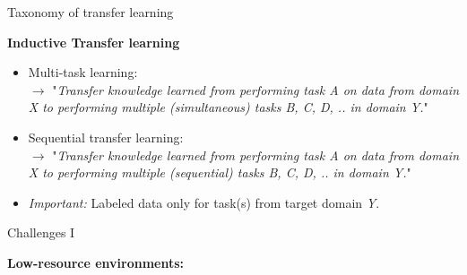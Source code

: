 
\begin{frame}{Taxonomy of transfer learning \href{https://ruder.io/thesis/}{}}

\vfill

	\textbf{Inductive Transfer learning}

	\begin{itemize}
		\item Multi-task learning:\\
					$\rightarrow$ "\textit{Transfer knowledge learned from performing task A on data from domain X to performing multiple (simultaneous) tasks B, C, D, .. in domain Y.}"\\\mbox{}
		\item Sequential transfer learning:\\
					$\rightarrow$ "\textit{Transfer knowledge learned from performing task A on data from domain X to performing multiple (sequential) tasks B, C, D, .. in domain Y.}"\\\mbox{}
		\item \textit{Important:} Labeled data only for task(s) from target domain \textit{Y}.
	\end{itemize}
	
\vfill

\end{frame}


\begin{vbframe}{Challenges I}

\vfill

\textbf{Low-resource environments:}



\vfill

\end{vbframe}


